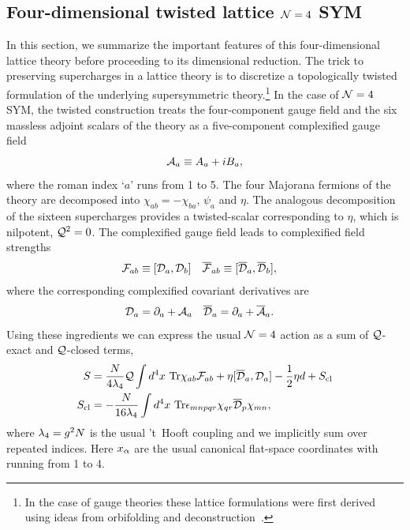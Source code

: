 \subsection{\label{sec:lattice_4d}Four-dimensional twisted lattice $\mathcal N = 4$ SYM}
In this section, we summarize the important features of this four-dimensional lattice theory before proceeding to its dimensional reduction.
The trick to preserving supercharges in a lattice theory is to discretize a topologically twisted formulation of the underlying supersymmetric theory.\footnote{In the case of gauge theories these lattice formulations were first derived using ideas from orbifolding and deconstruction~\cite{Cohen:2003xe, Cohen:2003qw, Kaplan:2005ta}.}
In the case of $\mathcal N = 4$ SYM, the twisted construction treats the four-component gauge field and the six massless adjoint scalars of the theory as a five-component complexified gauge field
\begin{equation}
  \label{complexification}
  \mathcal A_a \equiv A_a + iB_a,
\end{equation}
where the roman index `$a$' runs from 1 to 5.
The four Majorana fermions of the theory are decomposed into $\chi_{ab} = -\chi_{ba}$, $\psi_a$ and $\eta$.
The analogous decomposition of the sixteen supercharges provides a twisted-scalar \cQ corresponding to $\eta$, which is nilpotent, $\mathcal Q^2 = 0$.
The complexified gauge field leads to complexified field strengths
\begin{align}
  {\cal F}_{ab} & \equiv [\mathcal D_a, \mathcal D_b] &
  \overline{\mathcal F}_{ab} & \equiv [\overline{\mathcal D}_a, \overline{\mathcal D}_b],
\end{align}
where the corresponding complexified covariant derivatives are
\begin{align}
  \mathcal D_a & = \partial_a + \mathcal A_a &
  \overline{\mathcal D}_a & = \partial_a + \overline{\mathcal A}_a.
\end{align}
Using these ingredients we can express the usual $\mathcal N = 4$ action as a sum of $\mathcal Q$-exact and $\mathcal Q$-closed terms,
\begin{equation}
  \label{eq:contSYM}
  \begin{split}
    S & = \frac{N}{4\lam_4} \cQ \int d^4 x \ \Tr{\chi_{ab}\cF_{ab} + \eta [\cDbar_a, \cD_a] - \frac{1}{2}\eta d} + S_{\text{cl}} \\
    S_{\text{cl}} & = -\frac{N}{16\lam_4} \int d^4 x \ \Tr{\epsilon_{mnpqr} \chi_{qr} \cDbar_p \chi_{mn}},
  \end{split}
\end{equation}
where $\lambda_4 = g^2 N$ is the usual 't~Hooft coupling and we implicitly sum over repeated indices.
Here $x_{\alpha}$ are the usual canonical flat-space coordinates with \al running from 1 to 4.
